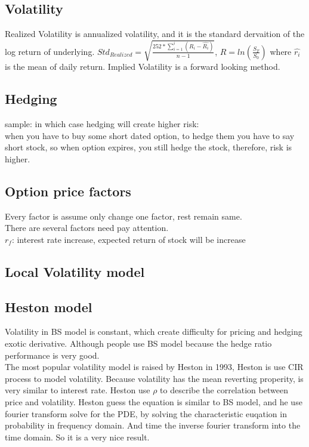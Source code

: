 \documentclass[a4paper,11pt]{article}
\begin{document}
\subsection{Volatility}
Realized Volatility is annualized volatility, and it is the standard dervaition of the log return of underlying. $Std_{Realized}=\sqrt{\frac{252*\sum_{i=1}^{i} (R_i-\hat{R_i})}{n-1}}$, $R=ln(\frac{S_T}{S_0})$ where $\hat{r_i}$ is the mean of daily return.
Implied Volatility is a forward looking method.
\subsection{Hedging}
sample: in which case hedging will create higher risk:\\
when you have to buy some short dated option, to hedge them you have to say short stock, so when option expires, you still hedge the stock, therefore, risk is higher. \\
\subsection{Option price factors}
Every factor is assume only change one factor, rest remain same. \\
There are several factors need pay attention.\\
$r_f$: interest rate increase, expected return of stock will be increase









\subsection{Local Volatility model}
\subsection{Heston model}
Volatility in BS model is constant, which create difficulty for pricing and hedging exotic derivative. Although people use BS model because the hedge ratio performance is very good.\\
The most popular volatility model is raised by Heston in 1993,  Heston is use CIR process to model volatility. Because volatility has the mean reverting properity, is very similar to interest rate. Heston use $\rho$ to describe the correlation between price and volatility. Heston guess the equation is similar to BS model, and he use fourier transform solve for the PDE, by solving the characteristic euqation in probability in frequency domain. And time the inverse fourier transform into the time domain. So it is a very nice result.\\
\end{document}
